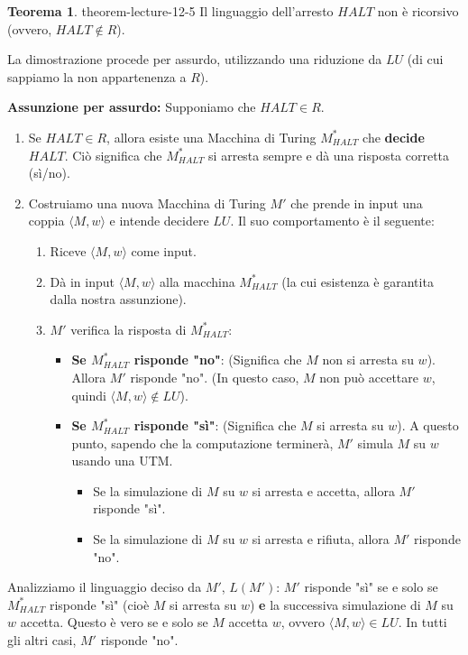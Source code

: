 \documentclass[a4paper]{article}
\makeatletter
\theoremstyle{definition} %
\newtheorem{theorem}{Teorema}
[section] %
\renewenvironment{proof}[1][\proofname]{\par
  \pushQED{\qed}%
  \normalfont \topsep6\p@\@plus6\p@\relax
  \trivlist
  \item[\hskip\labelsep
        \bfseries
    #1\@addpunct{.}]\ignorespaces
}{%
  \popQED\endtrivlist\@endpefalse
}
\makeatother
\begin{document}
\begin{theorem}{}{{ theorem-lecture-12-5 }}
Il linguaggio dell'arresto $HALT$ non è ricorsivo (ovvero, $HALT \notin R$).
\end{theorem}
\begin{proof}
La dimostrazione procede per assurdo, utilizzando una riduzione da $LU$ (di cui sappiamo la non appartenenza a $R$).

\textbf{Assunzione per assurdo:} Supponiamo che $HALT \in R$.
\begin{enumerate}
    \item Se $HALT \in R$, allora esiste una Macchina di Turing $M_{HALT}^*$ che \textbf{decide} $HALT$. Ciò significa che $M_{HALT}^*$ si arresta sempre e dà una risposta corretta (sì/no).
    \item Costruiamo una nuova Macchina di Turing $M'$ che prende in input una coppia $\langle M, w \rangle$ e intende decidere $LU$. Il suo comportamento è il seguente:
    \begin{enumerate}
        \item Riceve $\langle M, w \rangle$ come input.
        \item Dà in input $\langle M, w \rangle$ alla macchina $M_{HALT}^*$ (la cui esistenza è garantita dalla nostra assunzione).
        \item $M'$ verifica la risposta di $M_{HALT}^*$:
        \begin{itemize}
            \item \textbf{Se $M_{HALT}^*$ risponde "no"}: (Significa che $M$ non si arresta su $w$). Allora $M'$ risponde "no". (In questo caso, $M$ non può accettare $w$, quindi $\langle M, w \rangle \notin LU$).
            \item \textbf{Se $M_{HALT}^*$ risponde "sì"}: (Significa che $M$ si arresta su $w$). A questo punto, sapendo che la computazione terminerà, $M'$ simula $M$ su $w$ usando una UTM.
            \begin{itemize}
                \item Se la simulazione di $M$ su $w$ si arresta e accetta, allora $M'$ risponde "sì".
                \item Se la simulazione di $M$ su $w$ si arresta e rifiuta, allora $M'$ risponde "no".
            \end{itemize}
        \end{itemize}
    \end{enumerate}
\end{enumerate}
Analizziamo il linguaggio deciso da $M'$, $L(M')$:
$M'$ risponde "sì" se e solo se $M_{HALT}^*$ risponde "sì" (cioè $M$ si arresta su $w$) \textbf{e} la successiva simulazione di $M$ su $w$ accetta. Questo è vero se e solo se $M$ accetta $w$, ovvero $\langle M, w \rangle \in LU$. In tutti gli altri casi, $M'$ risponde "no".


\end{proof}
\end{document}
